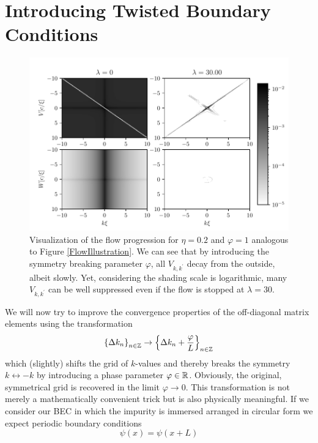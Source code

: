 \section{Introducing Twisted Boundary Conditions}
\begin{figure}[H]
    \centering
    \includegraphics[width=\textwidth]{figures/plots/PDF/FlowIllustrationPhi.pdf}
    \caption[Flow Visualization for $\eta=0.2$ and $\varphi = 1$]{Visualization of the flow progression for $\eta=0.2$ and $\varphi = 1$ analogous to Figure \ref{FlowIllustration}. We can see that by introducing the symmetry breaking parameter $\varphi$, all $V_{k,k^\prime}$ decay from the outside, albeit slowly. Yet, considering the shading scale is logarithmic, many $V_{k,k^\prime}$ can be well suppressed even if the flow is stopped at $\lambda=30$.}
    \label{FlowIllustrationPhi}
\end{figure}
We will now try to improve the convergence properties of the off-diagonal matrix elements using the transformation
\begin{equation} \label{twisted_trafo}
\left\{\Delta k_n\right\}_{n\in\mathbb{Z}}\rightarrow \left\{\Delta k_n+\frac{\varphi}{L}\right\}_{n\in\mathbb{Z}}
\end{equation}
 which (slightly) shifts the grid of $k$-values and thereby breaks the symmetry $k\leftrightarrow -k$ by introducing a phase parameter $\varphi\in\mathbb{R}$. Obviously, the original, symmetrical grid is recovered in the limit $\varphi\rightarrow 0$. 
This transformation is not merely a mathematically convenient trick but is also physically meaningful. If we consider our BEC in which the impurity is immersed arranged in circular form we expect periodic boundary conditions
\begin{equation}
\psi(x)=\psi(x+L)
\end{equation}
